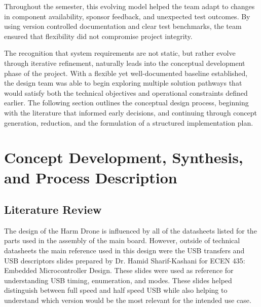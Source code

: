 \documentclass[12pt]{article}
\begin{document}
\par Throughout the semester, this evolving model helped the team adapt to changes in component availability, sponsor feedback, and unexpected test outcomes. By using version controlled documentation and clear test benchmarks, the team ensured that flexibility did not compromise project integrity.

\par The recognition that system requirements are not static, but rather evolve through iterative refinement, naturally leads into the conceptual development phase of the project. With a flexible yet well-documented baseline established, the design team was able to begin exploring multiple solution pathways that would satisfy both the technical objectives and operational constraints defined earlier. The following section outlines the conceptual design process, beginning with the literature that informed early decisions, and continuing through concept generation, reduction, and the formulation of a structured implementation plan.


\section{Concept Development, Synthesis, and Process Description}
\subsection{Literature Review}
The design of the Harm Drone is influenced by all of the datasheets listed for the parts used in the assembly of the main board. However, outside of technical datasheets the main reference used in this design were the USB transfers and USB descriptors slides prepared by Dr. Hamid Sharif-Kashani for ECEN 435: Embedded Microcontroller Design. These slides were used as reference for understanding USB timing, enumeration, and modes. These slides helped distinguish between full speed and half speed USB while also helping to understand which version would be the most relevant for the intended use case.
\end{document}
